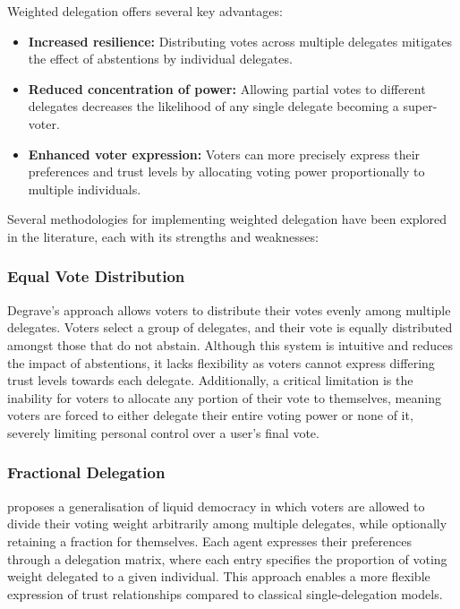 Weighted delegation offers several key advantages:
\begin{itemize}
  \item \textbf{Increased resilience:} Distributing votes across multiple delegates mitigates the effect of abstentions by individual delegates.
  \item \textbf{Reduced concentration of power:} Allowing partial votes to different delegates decreases the likelihood of any single delegate becoming a super-voter.
  \item \textbf{Enhanced voter expression:} Voters can more precisely express their preferences and trust levels by allocating voting power proportionally to multiple individuals.
\end{itemize}

Several methodologies for implementing weighted delegation have been explored in the literature, each with its strengths and weaknesses:

\subsubsection*{Equal Vote Distribution~\citep{degrave2014}}
Degrave's approach allows voters to distribute their votes evenly among multiple delegates. Voters select a group of delegates, and their vote is equally distributed amongst those that do not abstain.
Although this system is intuitive and reduces the impact of abstentions, it lacks flexibility as voters cannot express differing trust levels towards each delegate. Additionally, a critical limitation is the inability for voters to allocate any portion of their vote to themselves, meaning voters are forced to either delegate their entire voting power or none of it, severely limiting personal control over a user's final vote.

\subsubsection*{Fractional Delegation~\citep{bersetche2024}}

\citeauthor{bersetche2024} proposes a generalisation of liquid democracy in which voters are allowed to divide their voting weight arbitrarily among multiple delegates, while optionally retaining a fraction for themselves. Each agent expresses their preferences through a delegation matrix, where each entry specifies the proportion of voting weight delegated to a given individual. This approach enables a more flexible expression of trust relationships compared to classical single-delegation models.

